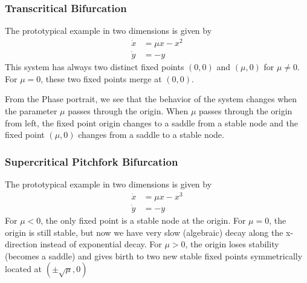 \subsubsection{Transcritical Bifurcation}
The prototypical example in two dimensions is given by
\begin{equation}
\begin{aligned}
\dot{x}&=\mu x-x^2\\
\dot{y}&=-y
\end{aligned}
\end{equation}
This system has always two distinct fixed points $(0,0)$ and $(\mu,0)$ for $\mu\neq0$. For $\mu=0$, these two fixed points merge at $(0, 0)$.
\begin{comment}
	\begin{figure}[h!]
	\centering
	\begin{subfigure}{0.45\linewidth}
	\centering
	\texttt{[image: tbf2.png]}
	\caption{Transcritical Bifurcation}
	\label{fig:tbf2}
	\end{subfigure}
	\vline
	\begin{subfigure}{0.45\linewidth}
	\centering
	\texttt{[image: sbbf2.png]}
	\caption{Subcritical Pitchfork Bifurcation}
	\label{fig:sbbf2}
	\end{subfigure}
	\caption{}
	\end{figure}
\end{comment}
From the Phase portrait, we see that the behavior of the system changes when the parameter $\mu$ passes through the origin.
When $\mu$ passes through the origin from left, the fixed point origin changes to a saddle from a stable node and the fixed point $(\mu,0)$ changes from a saddle to a stable node.
\subsubsection{Supercritical Pitchfork Bifurcation}
The prototypical example in two dimensions is given by
\begin{equation}
	\begin{aligned}
		\dot{x}&=\mu x-x^3\\
		\dot{y}&=-y
	\end{aligned}
\end{equation}
For $\mu<0$, the only fixed point is a stable node at the origin. For $\mu=0$, the origin is still stable, but now we have very slow (algebraic) decay along the x-direction instead of exponential decay.
For $\mu>0$, the origin loses stability (becomes a saddle) and gives birth to two new stable fixed points symmetrically located at $(\pm\sqrt{\mu},0)$
